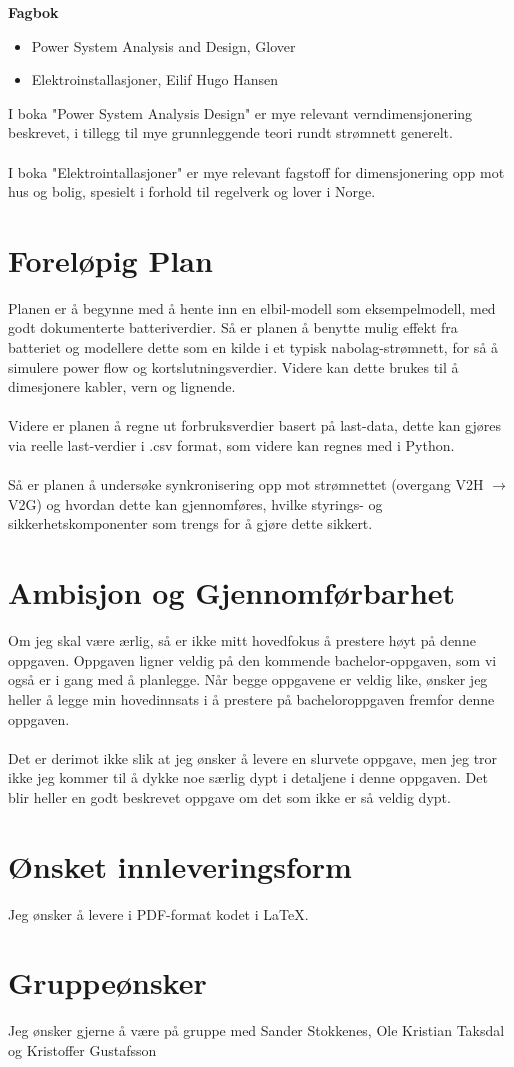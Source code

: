 \documentclass{article}
\begin{document}
\textbf{Fagbok}
\begin{itemize}
    \item Power System Analysis and Design, Glover \cite{glover}
    \item Elektroinstallasjoner, Eilif Hugo Hansen \cite{elektroinstallasjoner}
\end{itemize}
I boka "Power System Analysis Design" er mye relevant verndimensjonering beskrevet, i tillegg til mye grunnleggende teori rundt strømnett generelt. \\ \\
I boka "Elektrointallasjoner" er mye relevant fagstoff for dimensjonering opp mot hus og bolig, spesielt i forhold til regelverk og lover i Norge. 


\newpage
\section{Foreløpig Plan}
Planen er å begynne med å hente inn en elbil-modell som eksempelmodell, med godt dokumenterte batteriverdier. Så er planen å benytte mulig effekt fra batteriet og modellere dette som en kilde i et typisk nabolag-strømnett, for så å simulere power flow og kortslutningsverdier. Videre kan dette brukes til å dimesjonere kabler, vern og lignende. \\ \\

Videre er planen å regne ut forbruksverdier basert på last-data, dette kan gjøres via reelle last-verdier i .csv format, som videre kan regnes med i Python. \\ \\

Så er planen å undersøke synkronisering opp mot strømnettet (overgang V2H $\rightarrow$ V2G) og hvordan dette kan gjennomføres, hvilke styrings- og sikkerhetskomponenter som trengs for å gjøre dette sikkert. 


\newpage
\section{Ambisjon og Gjennomførbarhet}
Om jeg skal være ærlig, så er ikke mitt hovedfokus å prestere høyt på denne oppgaven. Oppgaven ligner veldig på den kommende bachelor-oppgaven, som vi også er i gang med å planlegge. Når begge oppgavene er veldig like, ønsker jeg heller å legge min hovedinnsats i å prestere på bacheloroppgaven fremfor denne oppgaven. 
\\ \\
Det er derimot ikke slik at jeg ønsker å levere en slurvete oppgave, men jeg tror ikke jeg kommer til å dykke noe særlig dypt i detaljene i denne oppgaven. Det blir heller en godt beskrevet oppgave om det som ikke er så veldig dypt. 


\section{Ønsket innleveringsform}
Jeg ønsker å levere i PDF-format kodet i \LaTeX. 

\section{Gruppeønsker}
Jeg ønsker gjerne å være på gruppe med Sander Stokkenes, Ole Kristian Taksdal og Kristoffer Gustafsson


\newpage
\printbibliography[title={Kilder}]
\end{document}
